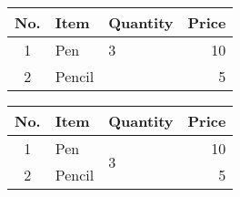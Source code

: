 \documentclass{article}
\begin{document}
	\begin{tabular}{|c|l|l|r|}
		\hline
		No. & Item & Quantity & Price \\
		\hline
		1 & Pen & 3 & 10 \\
		\cline{1-2}\cline{4-4}
		2 & Pencil & & 5 \\
		\hline
	\end{tabular}

\begin{tabular}{|c|l|l|r|}
	\hline
	No. & Item & Quantity & Price \\
	\hline
	1 & Pen & \multirow{2}{*}{3} & 10 \\
	\cline{1-2}\cline{4-4}
	2 & Pencil & & 5 \\
	\hline
\end{tabular}
\end{document}
